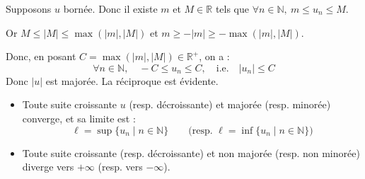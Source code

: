 \documentclass[a4paper,11pt]{article}
\newcommand{\R}{\mathbb{R}}
\newcommand{\N}{\mathbb{N}}
\begin{document}
\begin{demonstration}
Supposons $u$ bornée. Donc il existe $m$ et $M \in \R$ tels que $\forall n \in \N, \ m \le u_n \le M$.

Or $M \le |M| \le \max(|m|, |M|)$ et $m \ge -|m| \ge -\max(|m|, |M|)$.

Donc, en posant $C = \max(|m|, |M|) \in \R^+$, on a :
\[
\forall n \in \N, \quad -C \le u_n \le C, \quad \text{i.e.} \quad |u_n| \le C
\]
Donc $|u|$ est majorée. La réciproque est évidente.
\end{demonstration}

\begin{theoreme}
\begin{itemize}
    \item Toute suite croissante $u$ (resp. décroissante) et majorée (resp. minorée) converge, et sa limite est :
    \[
    \ell = \sup \{ u_n \mid n \in \N \} \qquad \big(\text{resp. } \ell = \inf \{ u_n \mid n \in \N \}\big)
    \]
    \item Toute suite croissante (resp. décroissante) et non majorée (resp. non minorée) diverge vers $+\infty$ (resp. vers $-\infty$).
\end{itemize}
\end{theoreme}
\end{document}
